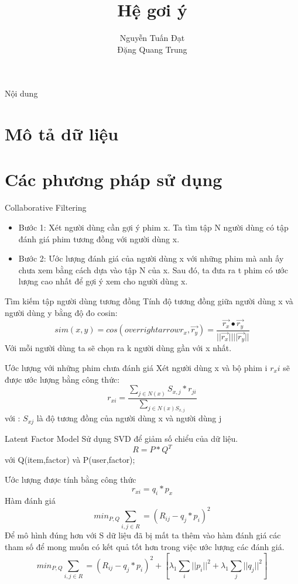 \documentclass{beamer}
\title[]{{\huge \bf Hệ gơi ý}\\
  }
\author[]{
Nguyễn Tuấn Đạt\\%
Đặng Quang Trung\\
}
\institute[]{
}
\begin{document}
\begin{frame}
\titlepage
\end{frame}

\begin{frame}{Nội dung}
\tableofcontents
\end{frame}

\section{Mô tả dữ liệu}
\section{Các phương pháp sử dụng}
\begin{frame}{Collaborative Filtering}
\color{vhilight}{ Ý tưởng :}
\begin{itemize}
\item Bước 1: Xét người dùng cần gợi ý phim x. Ta tìm tập N người dùng có tập đánh giá phim tương đồng với người dùng x. 
\item Bước 2: Ước lượng đánh giá của người dùng x với những phim mà anh ấy chưa xem bằng cách dựa vào tập N của x. Sau đó, ta đưa ra t phim có ước lượng cao nhất để gợi ý xem cho người dùng x.
\end{itemize} 
\end{frame}
\begin{frame}{Tìm kiếm tập người dùng tương đồng}
Tính độ tương đồng giữa người dùng x và người dùng y bằng độ đo cosin:
$$sim(x,y)=cos(overrightarrow{r_x},\overrightarrow{r_y})=\dfrac{\overrightarrow{r_x}\bullet\overrightarrow{r_y}}{||\overrightarrow{r_x}||||\overrightarrow{r_y}||}$$
Với mỗi người dùng ta sẽ chọn ra k người dùng gần với x nhất. 
\end{frame}
\begin{frame}{Ước lượng với những phim chưa đánh giá}
Xét người dùng x và bộ phim i $r_xi$ sẽ được ước lượng bằng công thức: 
$$ r_{xi}=\dfrac{\sum_{j\in N(x)} S_{x,j} *r_{ji}}{\sum_{j\in N(x) S_{x,j}}}$$
với : $S_{xj}$ là độ tương đồng của người dùng x và người dùng j

\end{frame}
\begin{frame}{Latent Factor Model}
{\color{vhilight}{ Ý tưởng :}} 
Sử dụng SVD để giảm số chiểu của dữ liệu.
$$R=P*Q^T$$
với Q(item,factor) và P(user,factor);


Ước lượng được tính bằng công thức $$r_{xi}=q_i*p_x$$ 
Hàm đánh giá $$ min_{P,Q} \sum_{i,j\in R} = (R_{ij}-q_j*p_i)^2$$
Để mô hình đúng hơn với S dữ liệu đã bị mất ta thêm vào hàm đánh giá các tham số để mong muốn có kết quả tốt hơn trong việc ước lượng các đánh giá.
$$ min_{P,Q} \sum_{i,j\in R} = (R_{ij}-q_j*p_i)^2+[\lambda_1 \sum_i ||p_i||^2 +\lambda_1 \sum_j ||q_j||^2]$$

\end{frame}
\end{document}
